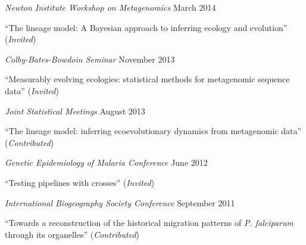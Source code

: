 \documentclass[10pt]{article}
\newenvironment{outerlist}[1][\enskip\textbullet]%
        {\begin{itemize}[#1]}{\end{itemize}%
         \vspace{-.6\baselineskip}}
\newenvironment{innerlist}[1][\enskip\textbullet]%
        {\begin{compactitem}[#1]}{\end{compactitem}}
\begin{document}
\begin{outerlist}
\item[] \textit{Newton Institute Workshop on Metagenomics}%
        \hfill {March 2014}
\begin{innerlist}
\item ``The lineage model: A Bayesian approach to inferring ecology and evolution''  (\emph{Invited})
\end{innerlist}
\end{outerlist} 


\begin{outerlist}
\item[] \textit{Colby-Bates-Bowdoin Seminar}%
        \hfill {November 2013}
\begin{innerlist}
\item ``Measurably evolving ecologies: statistical methods for metagenomic sequence data''  (\emph{Invited})
\end{innerlist}
\end{outerlist} 


\begin{outerlist}
\item[] \textit{Joint Statistical Meetings}%
        \hfill {August 2013}
\begin{innerlist}
\item ``The lineage model: inferring ecoevolutionary dynamics from metagenomic data''  (\emph{Contributed})
\end{innerlist}
\end{outerlist} 

\begin{outerlist}
\item[] \textit{Genetic Epidemiology of Malaria Conference}%
        \hfill {June 2012}
\begin{innerlist}
\item ``Testing pipelines with crosses''  (\emph{Invited})
\end{innerlist}
\end{outerlist} 


\begin{outerlist}
\item[] \textit{International Biogeography Society Conference}%
        \hfill {September 2011}
\begin{innerlist}
\item ``Towards a reconstruction of the historical migration patterns of \emph{P. falciparum} through its organelles''  (\emph{Contributed})
\end{innerlist}
\end{outerlist} 
\end{document}
